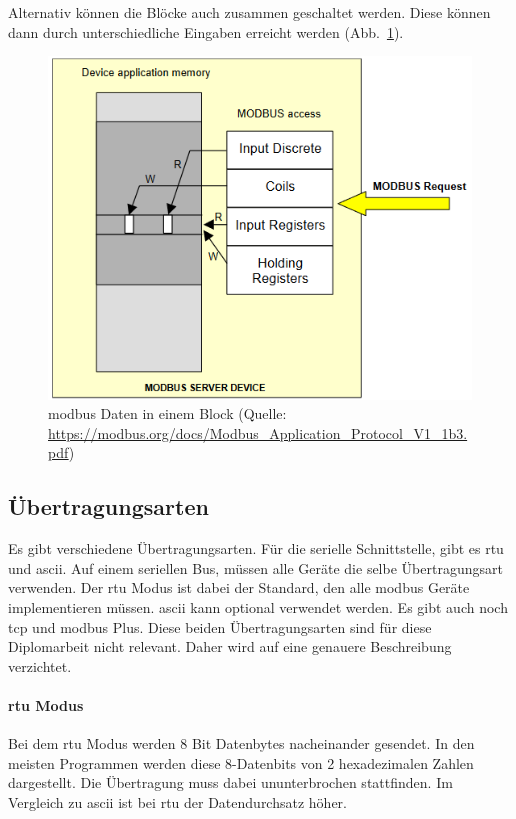Alternativ können die Blöcke auch zusammen geschaltet werden. Diese können dann durch unterschiedliche Eingaben erreicht werden (Abb.~\ref{fig:modbus_register_one_block}).
\begin{figure}[H]
	\centering
	\includegraphics[width=0.4\linewidth]{Bilder/Modbus_Data_Model_with_one_block}
	\caption{\gls{modbus} Daten in einem Block (Quelle: \url{https://modbus.org/docs/Modbus_Application_Protocol_V1_1b3.pdf})}
	\label{fig:modbus_register_one_block}
\end{figure}

\subsection{Übertragungsarten} \label{modbus_uebertragungsarten}
Es gibt verschiedene Übertragungsarten. Für die serielle Schnittstelle, gibt es \acf{rtu} und \acf{ascii}. Auf einem seriellen Bus, müssen alle Geräte die selbe Übertragungsart verwenden. Der \acs{rtu} Modus ist dabei der Standard, den alle \gls{modbus} Geräte implementieren müssen. \acs{ascii} kann optional verwendet werden. \newline Es gibt auch noch \acs{tcp} und \gls{modbus} Plus. Diese beiden Übertragungsarten sind für diese Diplomarbeit nicht relevant. Daher wird auf eine genauere Beschreibung verzichtet.

\paragraph{\acs{rtu} Modus}
Bei dem \acs{rtu} Modus werden 8 Bit Datenbytes nacheinander gesendet. In den meisten Programmen werden diese 8-Datenbits von 2 hexadezimalen Zahlen dargestellt. Die Übertragung muss dabei ununterbrochen stattfinden. Im Vergleich zu \acs{ascii} ist bei \acs{rtu} der Datendurchsatz höher. 

